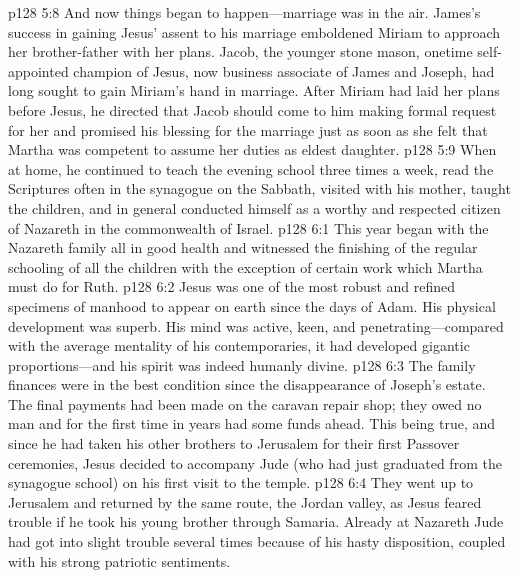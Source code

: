 \vs p128 5:8 And now things began to happen---marriage was in the air. James’s success in gaining Jesus’ assent to his marriage emboldened Miriam to approach her brother\hyp{}father with her plans. Jacob, the younger stone mason, onetime self\hyp{}appointed champion of Jesus, now business associate of James and Joseph, had long sought to gain Miriam’s hand in marriage. After Miriam had laid her plans before Jesus, he directed that Jacob should come to him making formal request for her and promised his blessing for the marriage just as soon as she felt that Martha was competent to assume her duties as eldest daughter.
\pc \vs p128 5:9 When at home, he continued to teach the evening school three times a week, read the Scriptures often in the synagogue on the Sabbath, visited with his mother, taught the children, and in general conducted himself as a worthy and respected citizen of Nazareth in the commonwealth of Israel.
\vs p128 6:1 This year began with the Nazareth family all in good health and witnessed the finishing of the regular schooling of all the children with the exception of certain work which Martha must do for Ruth.
\pc \vs p128 6:2 Jesus was one of the most robust and refined specimens of manhood to appear on earth since the days of Adam. His physical development was superb. His mind was active, keen, and penetrating---compared with the average mentality of his contemporaries, it had developed gigantic proportions---and his spirit was indeed humanly divine.
\pc \vs p128 6:3 The family finances were in the best condition since the disappearance of Joseph’s estate. The final payments had been made on the caravan repair shop; they owed no man and for the first time in years had some funds ahead. This being true, and since he had taken his other brothers to Jerusalem for their first Passover ceremonies, Jesus decided to accompany Jude (who had just graduated from the synagogue school) on his first visit to the temple.
\vs p128 6:4 They went up to Jerusalem and returned by the same route, the Jordan valley, as Jesus feared trouble if he took his young brother through Samaria. Already at Nazareth Jude had got into slight trouble several times because of his hasty disposition, coupled with his strong patriotic sentiments.
